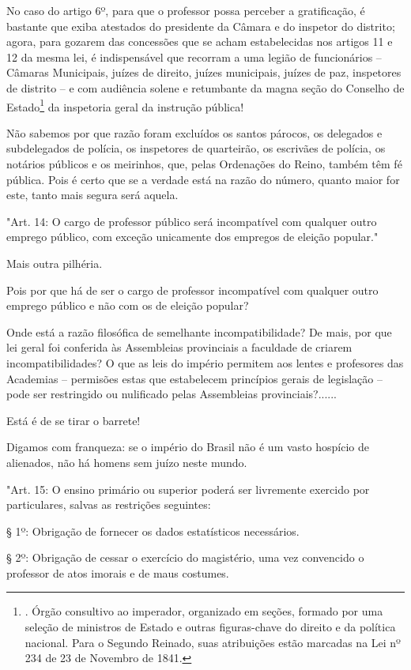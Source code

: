 No caso do artigo 6º, para que o professor possa perceber a
gratificação, é bastante que exiba atestados do presidente da Câmara e
do inspetor do distrito; agora, para gozarem das concessões que se acham
estabelecidas nos artigos 11 e 12 da mesma lei, é indispensável que
recorram a uma legião de funcionários -- Câmaras Municipais, juízes de
direito, juízes municipais, juízes de paz, inspetores de distrito -- e
com audiência solene e retumbante da magna seção do Conselho de
Estado\footnote{. Órgão consultivo ao imperador, organizado em seções,
  formado por uma seleção de ministros de Estado e outras figuras-chave
  do direito e da política nacional. Para o Segundo Reinado, suas
  atribuições estão marcadas na Lei nº 234 de 23 de Novembro de 1841.}
da inspetoria geral da instrução pública!

Não sabemos por que razão foram excluídos os santos párocos, os
delegados e subdelegados de polícia, os inspetores de quarteirão, os
escrivães de polícia, os notários públicos e os meirinhos, que, pelas
Ordenações do Reino, também têm fé pública. Pois é certo que se a
verdade está na razão do número, quanto maior for este, tanto mais
segura será aquela.

"Art. 14: O cargo de professor público será incompatível com qualquer
outro emprego público, com exceção unicamente dos empregos de eleição
popular."

Mais outra pilhéria.

Pois por que há de ser o cargo de professor incompatível com qualquer
outro emprego público e não com os de eleição popular?

Onde está a razão filosófica de semelhante incompatibilidade? De mais,
por que lei geral foi conferida às Assembleias provinciais a faculdade
de criarem incompatibilidades? O que as leis do império permitem aos
lentes e profesores das Academias -- permisões estas que estabelecem
princípios gerais de legislação -- pode ser restringido ou nulificado
pelas Assembleias provinciais?......

Está é de se tirar o barrete!

Digamos com franqueza: se o império do Brasil não é um vasto hospício de
alienados, não há homens sem juízo neste mundo.

"Art. 15: O ensino primário ou superior poderá ser livremente exercido
por particulares, salvas as restrições seguintes:

§ 1º: Obrigação de fornecer os dados estatísticos necessários.

§ 2º: Obrigação de cessar o exercício do magistério, uma vez convencido
o professor de atos imorais e de maus costumes.

